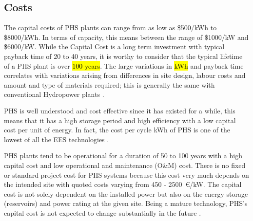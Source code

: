 
\subsection{Costs}

The capital costs of PHS plants can range from as low as \$500/kWh to
\$8000/kWh. In terms of capacity, this means between the range of \$1000/kW and
\$6000/kW. While the Capital Cost is a long term investment with typical
payback time of 20 to 40 years, it is worthy to consider that the typical
lifetime of a PHS plant is over \hl{100 years}. The large variations in
\hl{kWh} and payback time correlates with variations arising from differences
in site design, labour costs and amount and type of materials required; this is
generally the same with conventional Hydropower plants
\citep{Kocher-Oberlehner2014}.

PHS is well understood and cost effective since it has existed for a
while\citep{ESMStudy2010, Ramirez2016}, this means that it has a high storage
period and high efficiency with a low capital cost per unit of energy.  In
fact, the cost per cycle kWh of PHS is one of the lowest of all the EES
technologies \citep{Chen2009}.



%


PHS plants tend to be operational for a duration of 50 to 100 years with a high
capital cost and low operational and maintenance (O\&M) cost. There is no fixed
or standard project cost for PHS systems because this cost very much depends on
the intended site with quoted costs varying from 450 - 2500~\euro{}/kW.  The
capital cost is not solely dependent on the installed power but also on the
energy storage (reservoirs) and power rating at the given site.  Being a mature
technology, PHS's capital cost is not expected to change substantially in the
future \citep{Zach2012}.

